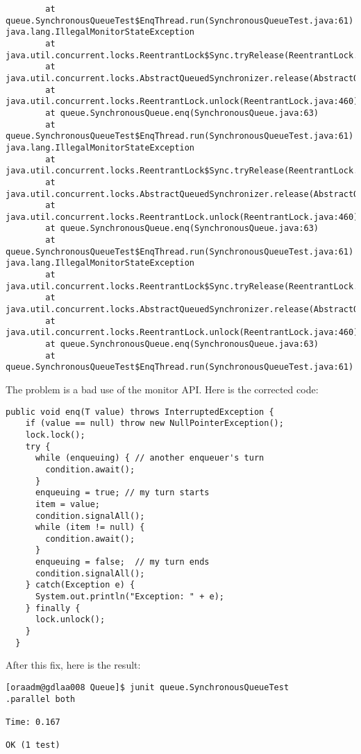 \begin{verbatim}
        at queue.SynchronousQueueTest$EnqThread.run(SynchronousQueueTest.java:61)
java.lang.IllegalMonitorStateException
        at java.util.concurrent.locks.ReentrantLock$Sync.tryRelease(ReentrantLock.java:155)
        at java.util.concurrent.locks.AbstractQueuedSynchronizer.release(AbstractQueuedSynchronizer.java:1260)
        at java.util.concurrent.locks.ReentrantLock.unlock(ReentrantLock.java:460)
        at queue.SynchronousQueue.enq(SynchronousQueue.java:63)
        at queue.SynchronousQueueTest$EnqThread.run(SynchronousQueueTest.java:61)
java.lang.IllegalMonitorStateException
        at java.util.concurrent.locks.ReentrantLock$Sync.tryRelease(ReentrantLock.java:155)
        at java.util.concurrent.locks.AbstractQueuedSynchronizer.release(AbstractQueuedSynchronizer.java:1260)
        at java.util.concurrent.locks.ReentrantLock.unlock(ReentrantLock.java:460)
        at queue.SynchronousQueue.enq(SynchronousQueue.java:63)
        at queue.SynchronousQueueTest$EnqThread.run(SynchronousQueueTest.java:61)
java.lang.IllegalMonitorStateException
        at java.util.concurrent.locks.ReentrantLock$Sync.tryRelease(ReentrantLock.java:155)
        at java.util.concurrent.locks.AbstractQueuedSynchronizer.release(AbstractQueuedSynchronizer.java:1260)
        at java.util.concurrent.locks.ReentrantLock.unlock(ReentrantLock.java:460)
        at queue.SynchronousQueue.enq(SynchronousQueue.java:63)
        at queue.SynchronousQueueTest$EnqThread.run(SynchronousQueueTest.java:61)
\end{verbatim}
\par
The problem is a bad use of the monitor API. Here is the corrected code:
\par
\hfill
\begin{lstlisting}[style=numbers]
  public void enq(T value) throws InterruptedException {
    if (value == null) throw new NullPointerException();
    lock.lock();
    try {
      while (enqueuing) { // another enqueuer's turn
        condition.await();
      }
      enqueuing = true; // my turn starts
      item = value;
      condition.signalAll();
      while (item != null) {
        condition.await();
      }
      enqueuing = false;  // my turn ends
      condition.signalAll();
    } catch(Exception e) {
      System.out.println("Exception: " + e);
    } finally {
      lock.unlock();
    }
  }    
\end{lstlisting}
\hfill
\par
After this fix, here is the result:
\par
\hfill
\begin{verbatim}
[oraadm@gdlaa008 Queue]$ junit queue.SynchronousQueueTest
.parallel both

Time: 0.167

OK (1 test)
\end{verbatim}
\hfill
\par
